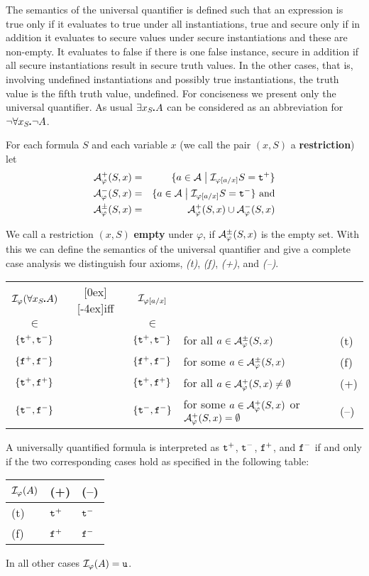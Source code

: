 \documentclass{\filespath jancl}
\def\setdivider{\;\bigl|\;}
\def\phi{\varphi}
\def\cA{{\cal A}}\def\cB{{\cal B}}\def\cC{{\cal C}}
\let\phi\varphi
\def\sdot{\rule{.3ex}{.3ex}\hspace{-0.4ex}\;}
\newcommand{\twts}{{{\tt t}^+}}
\newcommand{\twfs}{{{\tt f}^+}}
\newcommand{\twti}{{{\tt t}^-}}
\newcommand{\twfi}{{{\tt f}^-}}
\newcommand{\twu}{{\tt u}}
\newcommand{\set}[1]{\left\{#1\right\}}
\begin{document}
The semantics of the universal quantifier is defined such that an
expression is true only if it evaluates to true under all
instantiations, true and secure only if in addition it evaluates to
secure values under secure instantiations and these are non-empty.  It
evaluates to false if there is one false instance, secure in addition
if all secure instantiations result in secure truth values. In the
other cases, that is, involving undefined instantiations and possibly
true instantiations, the truth value is the fifth truth value,
undefined. For conciseness we present only the universal
quantifier. As usual $\exists x_S\sdot A$ can be considered as an
abbreviation for $\non\forall x_S\sdot\non A$.
\begin{definition}\label{Def:quantifiers}    
For each formula $S$ and each variable $x$ (we call the pair $(x,S)$ a {\bf
  restriction}) let
\begin{eqnarray*}
\cA^+_\phi(S,x)   & = & \{a\in\cA\setdivider\cI_{\phi[a/x]}S=\twts\}\\
\cA^-_\phi(S,x)   & = & \{a\in\cA\setdivider\cI_{\phi[a/x]}S=\twti\}{\rm\ and}\\
\cA^\pm_\phi(S,x) & = & \cA^+_\phi(S,x)\cup\cA^-_\phi(S,x)
\end{eqnarray*}

We call a restriction $(x,S)$ {\bf empty} under $\phi$, if
$\cA^\pm_\phi(S,x)$ is the empty set.  With this we can define the
semantics of the universal quantifier and give a complete case
analysis we distinguish four axioms, \textit{(t)}, \textit{(f)}, \textit{(+)}, and \textit{(--)}.

\begin{tabular}{cccll}
$\cI_\phi(\forall x_S\sdot A)$ & \raisebox{-2ex}[0ex][-4ex]{iff} & $\cI_{\phi[a/x]}$\\
$\in$                        &     & $\in$\\\hline
$\set{\twts,\twti}$ &  &$\set{\twts,\twti}$ & for all
   $a\in\cA^\pm_\phi(S,x)$ & (t)\\

$\set{\twfs,\twfi}$ & & $\set{\twfs,\twfi}$ & for
  some $a\in\cA^\pm_\phi(S,x)$ & (f)\\

$\set{\twts,\twfs}$ &  & $\set{\twts,\twfs}$ & for all
   $a\in\cA^+_\phi(S,x)\not=\emptyset$ & (+)\\
 $\set{\twti,\twfi}$ &  & $\set{\twti,\twfi}$ & for some
   $a\in\cA^+_\phi(S,x)$ or $\cA^+_\phi(S,x)=\emptyset$ & (--)
 \end{tabular}

A universally quantified formula is interpreted as $\twts$, $\twti$,
$\twfs$, and $\twfi$ if and only
if the two corresponding cases hold as
specified in the following table:\\
\begin{tabular}{l|ll}
$\cI_\phi(A)$ & (+) & (--) \\\hline
(t)         & $\twts$ & $\twti$\\
(f)         & $\twfs$ & $\twfi$
\end{tabular}

In all other cases $\cI_\phi(A) = \twu$.
\end{definition}
\end{document}
